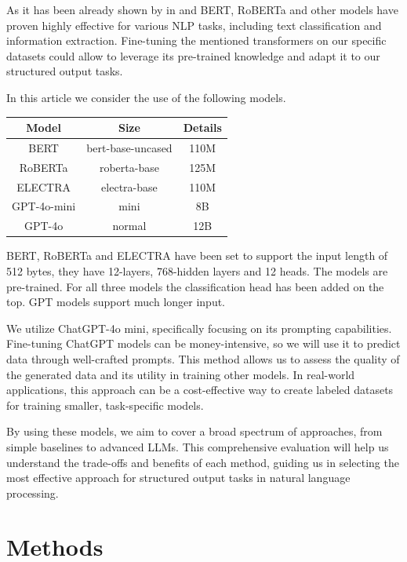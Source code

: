 \documentclass[11pt]{article}
\begin{document}
As it has been already shown by in \cite{springer} and \cite{arxiv1} BERT, RoBERTa and other models have proven highly effective for various NLP tasks, including text classification and information extraction. Fine-tuning the mentioned transformers on our specific datasets could allow to leverage its pre-trained knowledge and adapt it to our structured output tasks.

In this article we consider the use of the following models.

\begin{table}[h!]
\centering
 \begin{tabular}{c c c} 
 \hline
 Model & Size & Details \\ [0.5ex] 
 \hline
 BERT & bert-base-uncased & 110M \\ 
 RoBERTa & roberta-base & 125M \\
 ELECTRA & electra-base & 110M \\
 GPT-4o-mini & mini & 8B \\
 GPT-4o & normal & 12B \\  [1ex]
 \hline
 \end{tabular}
\end{table}

BERT, RoBERTa and ELECTRA have been set to support the input length of 512 bytes, they have 12-layers, 768-hidden layers and 12 heads. The models are pre-trained. For all three models the classification head has been added on the top. GPT models support much longer input.

We utilize ChatGPT-4o mini, specifically focusing on its prompting capabilities. Fine-tuning ChatGPT models can be money-intensive, so we will use it to predict data through well-crafted prompts. This method allows us to assess the quality of the generated data and its utility in training other models. In real-world applications, this approach can be a cost-effective way to create labeled datasets for training smaller, task-specific models.

By using these models, we aim to cover a broad spectrum of approaches, from simple baselines to advanced LLMs. This comprehensive evaluation will help us understand the trade-offs and benefits of each method, guiding us in selecting the most effective approach for structured output tasks in natural language processing.


\section{Methods}
\end{document}
